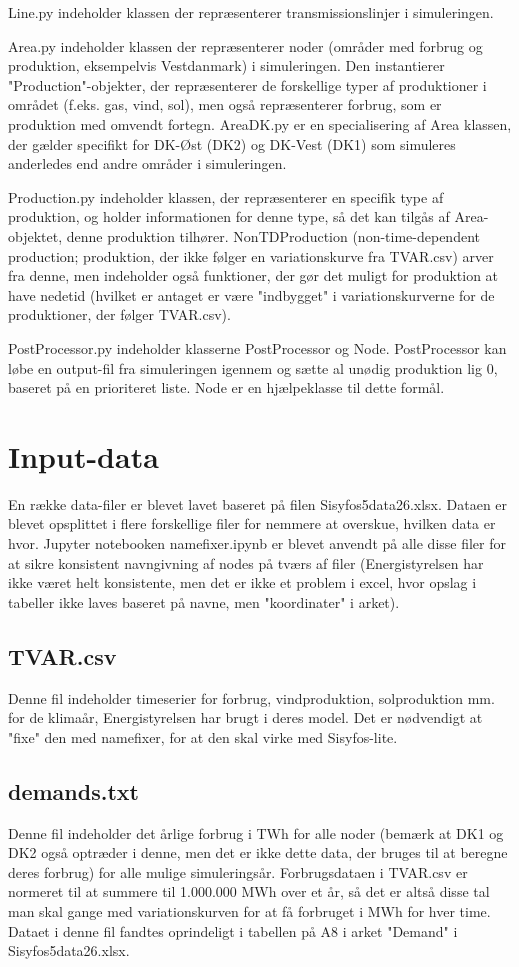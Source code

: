 \documentclass{article}
\begin{document}
Line.py indeholder klassen der repræsenterer transmissionslinjer i simuleringen.

Area.py indeholder klassen der repræsenterer noder (områder med forbrug og produktion, eksempelvis Vestdanmark) i simuleringen. Den instantierer "Production"-objekter, der repræsenterer de forskellige typer af produktioner i området (f.eks. gas, vind, sol), men også repræsenterer forbrug, som er produktion med omvendt fortegn. AreaDK.py er en specialisering af Area klassen, der gælder specifikt for DK-Øst (DK2) og DK-Vest (DK1) som simuleres anderledes end andre områder i simuleringen. 

Production.py indeholder klassen, der repræsenterer en specifik type af produktion, og holder informationen for denne type, så det kan tilgås af Area-objektet, denne produktion tilhører. NonTDProduction (non-time-dependent production; produktion, der ikke følger en variationskurve fra TVAR.csv) arver fra denne, men indeholder også funktioner, der gør det muligt for produktion at have nedetid (hvilket er antaget er være "indbygget" i variationskurverne for de produktioner, der følger TVAR.csv). 

PostProcessor.py indeholder klasserne PostProcessor og Node. PostProcessor kan løbe en output-fil fra simuleringen igennem og sætte al unødig produktion lig 0, baseret på en prioriteret liste. Node er en hjælpeklasse til dette formål.  

\section{Input-data}
En række data-filer er blevet lavet baseret på filen Sisyfos5data26.xlsx. Dataen er blevet opsplittet i flere forskellige filer for nemmere at overskue, hvilken data er hvor. Jupyter notebooken namefixer.ipynb er blevet anvendt på alle disse filer for at sikre konsistent navngivning af nodes på tværs af filer (Energistyrelsen har ikke været helt konsistente, men det er ikke et problem i excel, hvor opslag i tabeller ikke laves baseret på navne, men "koordinater" i arket). 
\subsection{TVAR.csv}
Denne fil indeholder timeserier for forbrug, vindproduktion, solproduktion mm. for de klimaår, Energistyrelsen har brugt i deres model. Det er nødvendigt at "fixe" den med namefixer, for at den skal virke med Sisyfos-lite. 
\subsection{demands.txt}
Denne fil indeholder det årlige forbrug i TWh for alle noder (bemærk at DK1 og DK2 også optræder i denne, men det er ikke dette data, der bruges til at beregne deres forbrug) for alle mulige simuleringsår. Forbrugsdataen i TVAR.csv er normeret til at summere til 1.000.000 MWh over et år, så det er altså disse tal man skal gange med variationskurven for at få forbruget i MWh for hver time. Dataet i denne fil fandtes oprindeligt i tabellen på A8 i arket "Demand" i Sisyfos5data26.xlsx.
\end{document}
